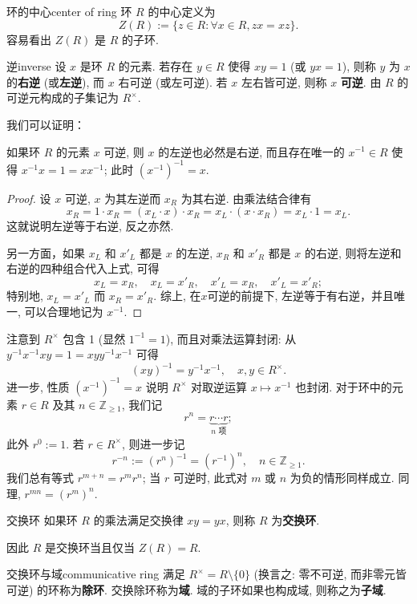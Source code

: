 \documentclass[12pt, a4paper]{ctexart}
\begin{document}
\begin{example}{环的中心}{center of ring}
	环 $R$ 的中心定义为
	\[
	Z(R) := \{z \in R : \forall x \in R, zx = xz\}.
	\]
	容易看出 $Z(R)$ 是 $R$ 的子环.
\end{example}
\begin{definition}{逆}{inverse}
	设 $x$ 是环 $R$ 的元素. 若存在 $y \in R$ 使得 $xy = 1$ (或 $yx = 1$), 则称 $y$ 为 $x$ 的\textbf{右逆} (或\textbf{左逆}), 而 $x$ 右可逆 (或左可逆). 若 $x$ 左右皆可逆, 则称 $x$ \textbf{可逆}. 由 $R$ 的可逆元构成的子集记为 $R^\times$.
\end{definition}
我们可以证明：
\begin{lemma}{}{}
	如果环 $R$ 的元素 $x$ 可逆, 则 $x$ 的左逆也必然是右逆, 而且存在唯一的 $x^{-1} \in R$ 使得 $x^{-1}x = 1 = xx^{-1}$; 此时 $(x^{-1})^{-1} = x$.
\end{lemma}
\begin{proof}
	设 $x$ 可逆, $x$ 为其左逆而 $x_R$ 为其右逆. 由乘法结合律有
	\[
	x_R = 1 \cdot x_R = (x_L \cdot x) \cdot x_R = x_L \cdot (x \cdot x_R) = x_L \cdot 1 = x_L.
	\]
	这就说明左逆等于右逆, 反之亦然. 
	
	另一方面，如果 $x_L$ 和 $x'_L$ 都是 $x$ 的左逆, $x_R$ 和 $x'_R$ 都是 $x$ 的右逆, 则将左逆和右逆的四种组合代入上式, 可得
	\[
	x_L = x_R, \quad x_L = x'_R, \quad x'_L = x_R, \quad x'_L = x'_R;
	\]
	特别地, $x_L = x'_L$ 而 $x_R = x'_R$. 综上, 在$x$可逆的前提下, 左逆等于有右逆，并且唯一, 可以合理地记为 $x^{-1}$.
\end{proof}
注意到 $R^\times$ 包含 1 (显然 $1^{-1} = 1$), 而且对乘法运算封闭: 从 $y^{-1}x^{-1}xy = 1 = xyy^{-1}x^{-1}$ 可得
\[
(xy)^{-1} = y^{-1}x^{-1}, \quad x, y \in R^\times.
\]
进一步, 性质 $(x^{-1})^{-1} = x$ 说明 $R^\times$ 对取逆运算 $x \mapsto x^{-1}$ 也封闭.
对于环中的元素 $r \in R$ 及其 $n \in \mathbb{Z}_{\geqslant 1}$, 我们记
\[
r^n = \underbrace{r \cdots r}_{n \text{ 项}};
\]
此外 $r^0 := 1$. 若 $r \in R^\times$, 则进一步记
\[
r^{-n} := (r^n)^{-1} = (r^{-1})^n, \quad n \in \mathbb{Z}_{\geqslant 1}.
\]
我们总有等式 $r^{m+n} = r^m r^n$; 当 $r$ 可逆时, 此式对 $m$ 或 $n$ 为负的情形同样成立. 同理, $r^{mn} = (r^m)^n$.
\begin{definition}{交换环}
	如果环 $R$ 的乘法满足交换律 $xy = yx$, 则称 $R$ 为\textbf{交换环}.
\end{definition}
因此 $R$ 是交换环当且仅当 $Z(R) = R$.
\begin{definition}{交换环与域}{communicative ring}
	满足 $R^\times = R \setminus \{0\}$ (换言之: 零不可逆, 而非零元皆可逆) 的环称为\textbf{除环}. 交换除环称为\textbf{域}. 域的子环如果也构成域, 则称之为\textbf{子域}.
\end{definition}
\end{document}
